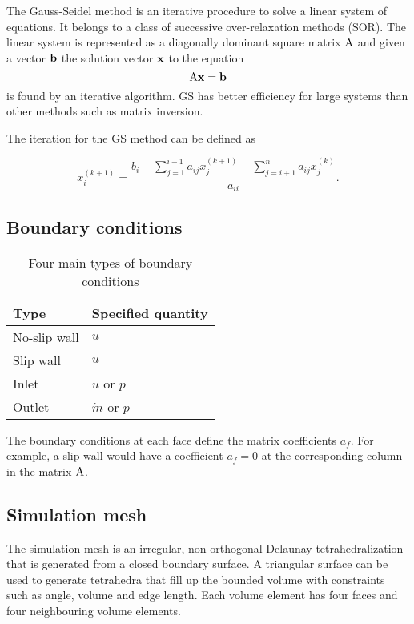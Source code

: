 \documentclass[12pt]{article}
\newcommand{\vb}[1]{\text{\textbf{#1}}}
\newcommand{\x}{\text}
\begin{document}
The Gauss-Seidel method is an iterative procedure to solve a linear system of equations. It belongs to a class of successive over-relaxation methods (SOR). The linear system is represented as a diagonally dominant square matrix $\x A$ and given a vector $\vb b$ the solution vector $\vb x$ to the equation
$$
\x A \vb x = \vb b
$$
is found by an iterative algorithm. GS has better efficiency for large systems than other methods such as matrix inversion.

The iteration for the GS method can be defined as \cite[p.~510]{golub}

\begin{equation}
  x_i^{(k + 1)} = \frac{b_i - \sum_{j=1}^{i-1} a_{ij} x_j^{(k + 1)} - \sum_{j=i+1}^{n} a_{ij} x_j^{(k)}}{a_{ii}}.
\end{equation}

\subsection{Boundary conditions}

\begin{table}[H]
  \centering
  \begin{tabular}{| l | l |}
    \hline
    Type & Specified quantity \\
    \hline
    No-slip wall & $u$ \\
    \hline
    Slip wall & $u$ \\
    \hline
    Inlet & $u$ or $p$ \\
    \hline
    Outlet & $\dot m$ or $p$\\
    \hline
  \end{tabular}
  \caption{Four main types of boundary conditions}
\end{table}
The boundary conditions at each face define the matrix coefficients $a_f$. For example, a slip wall would have a coefficient $a_f = 0$ at the corresponding column in the matrix $\x A$.

\subsection{Simulation mesh}

The simulation mesh is an irregular, non-orthogonal Delaunay tetrahedralization that is generated from a closed boundary surface. A triangular surface can be used to generate tetrahedra that fill up the bounded volume with constraints such as angle, volume and edge length. Each volume element has four faces and four neighbouring volume elements.
\end{document}
